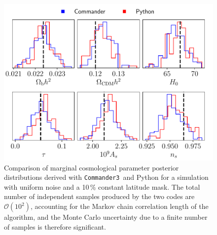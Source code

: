 \documentclass[twocolumn]{aa}
\def\commanderthree{\texttt{Commander3}}
\begin{document}
\begin{figure}
	\centering
	\includegraphics[width=\linewidth]{figures/subplots_posterior_10_mask.pdf}
	\caption{\label{fig:mask10}Comparison of marginal cosmological parameter posterior distributions derived with \commanderthree\ and Python for a simulation with uniform noise and a 10\,\% constant latitude mask. The total number of independent samples produced by the two codes are $\mathcal{O}(10^2)$, accounting for the Markov chain correlation length of the algorithm, and the Monte Carlo uncertainty due to a finite number of samples is therefore significant.}
\end{figure}
\end{document}

